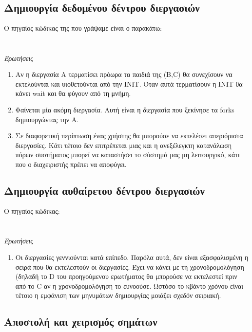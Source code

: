 \documentclass[a4paper,10pt]{article} \usepackage{anysize}
\begin{document}


\section*{} \setcounter{section}{1}
\subsection{Δημιουργία δεδομένου δέντρου διεργασιών} Ο πηγαίος κώδικας της που
γράψαμε είναι ο παρακάτω:

\inputminted[linenos,fontsize=\footnotesize,frame=leftline]{c}{files/ask2-fork.c}
\inputminted[linenos,fontsize=\footnotesize,frame=leftline]{bash}{files/ask2-fork.out}
\emph{Ερωτήσεις}
\begin{enumerate}
\item Αν η διεργασία A τερματίσει πρόωρα τα παιδιά της (B,C) θα συνεχίσουν να
εκτελούνται και υιοθετούνται από την INIT. Όταν αυτά τερματίσουν η INIT θα
κάνει wait και θα φύγουν από τη μνήμη.
\item Φαίνεται μία ακόμη διεργασία. Αυτή είναι η διεργασία που ξεκίνησε τα
forks δημιουργώντας την A.
\item Σε διαφορετική περίπτωση ένας χρήστης θα μπορούσε να εκτελέσει
απεριόριστα διεργασίες. Κάτι τέτοιο δεν επιτρέπεται μιας και η ανεξέλεγκτη
κατανάλωση πόρων συστήματος μπορεί να καταστήσει το σύστημά μας μη
λειτουργικό, κάτι που ο διαχειριστής πρέπει να αποφύγει.
\end{enumerate}


\subsection{Δημιουργία αυθαίρετου δέντρου διεργασιών} Ο πηγαίος κώδικας:
\inputminted[linenos,fontsize=\footnotesize,frame=leftline]{c}{files/ask2-tree.c}
\inputminted[linenos,fontsize=\footnotesize,frame=leftline]{bash}{files/ask2-tree.out}
\emph{Ερωτήσεις}
\begin{enumerate}
\item Οι διεργασίες γεννιούνται κατά επίπεδο. Παρόλα αυτά, δεν είναι
εξασφαλισμένη η σειρά που θα εκτελεστούν οι διεργασίες. Έχει να κάνει με τη
χρονοδρομολόγηση (δηλαδή το D του προηγούμενου ερωτήματος θα μπορούσε να
εκτελεστεί πριν από το C αν η χρονοδρομολόγηση το ευνοούσε. 
Ωστόσο το κβάντο χρόνου είναι τέτοιο η εμφάνιση των
μηνυμάτων δημιουργίας μοιάζει σχεδόν σειριακή.
\end{enumerate}


\subsection{Αποστολή και χειρισμός σημάτων}
\end{document}
